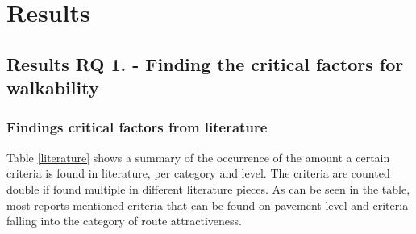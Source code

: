\chapter[Results]{Results}





\section{Results RQ 1. - Finding the critical factors for walkability}

\subsection{Findings critical factors from literature}

Table \ref{literature} shows a summary of the occurrence of the amount a certain criteria is found in literature, per category and level. The criteria are counted double if found multiple in different literature pieces. As can be seen in the table, most reports mentioned criteria that can be found on pavement level and criteria falling into the category of route attractiveness. 


